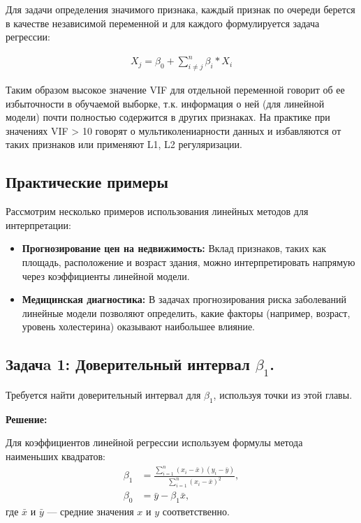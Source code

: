 \begin{itemize}
Для задачи определения значимого признака, каждый признак по очереди берется в качестве независимой переменной и для каждого формулируется задача регрессии:

\begin{align}
X_{j} = \beta_0 + \sum_{i \neq j}^n\beta_{i} * X_{i}
\end{align}

Таким образом высокое значение VIF для отдельной переменной говорит об ее избыточности в обучаемой выборке, т.к. информация о ней (для линейной модели) почти полностью содержится в других признаках. На практике при значениях VIF > 10 говорят о мультиколениарности данных и избавляются от таких признаков или применяют L1, L2 регуляризации.

\subsection*{Практические примеры}
Рассмотрим несколько примеров использования линейных методов для интерпретации:
\begin{itemize}
    \item \textbf{Прогнозирование цен на недвижимость:} Вклад признаков, таких как площадь, расположение и возраст здания, можно интерпретировать напрямую через коэффициенты линейной модели.
    \item \textbf{Медицинская диагностика:} В задачах прогнозирования риска заболеваний линейные модели позволяют определить, какие факторы (например, возраст, уровень холестерина) оказывают наибольшее влияние.
\end{itemize}

\subsection*{Задачa 1: Доверительный интервал \(\beta_1\).}

Требуется найти доверительный интервал для \(\beta_1\), используя точки из этой главы.

\textbf{Решение:}

Для коэффициентов линейной регрессии используем формулы метода наименьших квадратов:
\begin{align*}
\beta_1 &= \frac{\sum_{i=1}^n (x_i - \bar{x})(y_i - \bar{y})}{\sum_{i=1}^n (x_i - \bar{x})^2}, \\
\beta_0 &= \bar{y} - \beta_1 \bar{x},
\end{align*}
где \(\bar{x}\) и \(\bar{y}\) — средние значения \(x\) и \(y\) соответственно.


\end{itemize}
